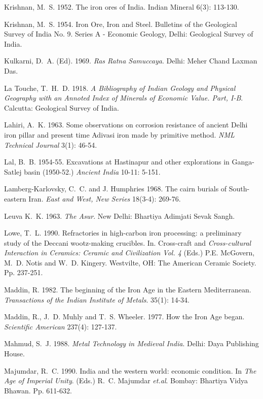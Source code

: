 \begin{thebibliography}{99}
 Krishnan, M.~S. 1952. The iron ores of India. Indian Mineral 6(3): 113-130.

 Krishnan, M.~S. 1954. Iron Ore, Iron and Steel. Bulletins of the Geological Survey of India No. 9. Series A - Economic Geology, Delhi: Geological Survey of India.

 Kulkarni, D.~A. (Ed). 1969. \textit{Ras Ratna Samuccaya}. Delhi: Meher Chand Laxman Das.

 La Touche, T.~H.~D. 1918. \textit{A Bibliography of Indian Geology and Physical Geography with an Annoted Index of Minerals of Economic Value. Part, I-B}. Calcutta: Geological Survey of India.

 Lahiri, A.~K. 1963. Some observations on corrosion resistance of ancient Delhi iron pillar and present time Adivasi iron made by primitive method. \textit{NML Technical Journal} 3(1): 46-54.

 Lal, B.~B. 1954-55. Excavations at Hastinapur and other explorations in Ganga-Satlej basin (1950-52.) \textit{Ancient India} 10-11: 5-151. 

 Lamberg-Karlovsky, C.~C. and J. Humphries 1968. The cairn burials of South-eastern Iran. \textit{East and West, New Series} 18(3-4): 269-76.

 Leuva K.~K. 1963. \textit{The Asur}. New Delhi: Bhartiya Adimjati Sevak Sangh.

 Lowe, T.~L. 1990. Refractories in high-carbon iron processing: a preliminary study of the Deccani wootz-making crucibles. In. Cross-craft and \textit{Cross-cultural Interaction in Ceramics: Ceramic and Civilization Vol. 4} (Eds.) P.E. McGovern, M.~D. Notis and W.~D. Kingery. Westvilte, OH: The American Ceramic Society. Pp. 237-251. 

 Maddin, R. 1982. The beginning of the Iron Age in the Eastern Mediterranean. \textit{Transactions of the Indian Institute of Metals}. 35(1): 14-34. 

 Maddin, R., J.~D. Muhly and T.~S. Wheeler. 1977. How the Iron Age began. \textit{Scientific American} 237(4): 127-137.

 Mahmud, S.~J. 1988. \textit{Metal Technology in Medieval India}. Delhi: Daya Publishing House. 

 Majumdar, R.~C. 1990. India and the western world: economic condition. In \textit{The Age of Imperial Unity}. (Eds.) R.~C. Majumdar \textit{et.al}. Bombay: Bhartiya Vidya Bhawan. Pp. 611-632.


\end{thebibliography}
